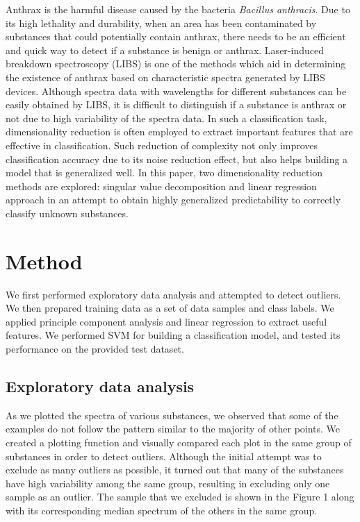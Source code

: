 \documentclass[12pt,onecolumn,letterpaper]{article}
\begin{document}
Anthrax is the harmful disease caused by the bacteria \textit{Bacillus anthracis}. Due to its high lethality and durability, when an area has been contaminated by substances that could potentially contain anthrax, there needs to be an efficient and quick way to detect if a substance is benign or anthrax. Laser-induced breakdown spectroscopy (LIBS) is one of the methods which aid in determining the existence of anthrax based on characteristic spectra generated by LIBS devices. Although spectra data with wavelengths for different substances can be easily obtained by LIBS, it is difficult to distinguish if a substance is anthrax or not due to high variability of the spectra data. In such a classification task, dimensionality reduction is often employed to extract important features that are effective in classification. Such reduction of complexity not only improves classification accuracy due to its noise reduction effect, but also helps building a model that is generalized well. In this paper, two dimensionality reduction methods are explored: singular value decomposition and linear regression approach in an attempt to obtain highly generalized predictability to correctly classify unknown substances.        
 
\section{Method}

We first performed exploratory data analysis and attempted to detect outliers. We then prepared training data as a set of data samples and class labels. We applied principle component analysis and linear regression to extract useful features. We performed SVM for building a classification model, and tested its performance on the provided test dataset.   

\subsection{Exploratory data analysis}

As we plotted the spectra of various substances, we observed that some of the examples do not follow the pattern similar to the majority of other points. We created a plotting function and visually compared each plot in the same group of substances in order to detect outliers. Although the initial attempt was to exclude as many outliers as possible, it turned out that many of the substances have high variability among the same group, resulting in excluding only one sample as an outlier. The sample that we excluded is shown in the Figure 1 along with its corresponding median spectrum of the others in the same group.   
\end{document}
